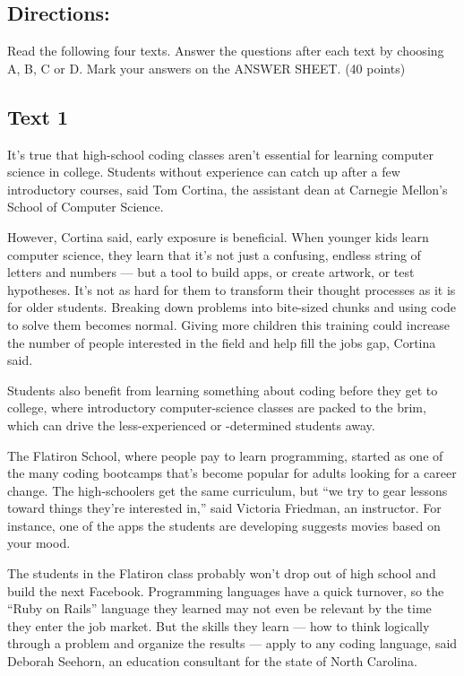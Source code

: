 \documentclass[UTF8,11pt]{ctexart}
\begin{document}
\subsection*{\textbf{Directions:}}


Read the following four texts. Answer the questions after each text by choosing A, B, C or D. Mark your answers on the ANSWER SHEET. (40 points)


\subsection*{\textbf{Text 1}}


It’s true that high-school coding classes aren’t essential for learning computer science in college. Students without experience can catch up after a few introductory courses, said Tom Cortina, the assistant dean at Carnegie Mellon’s School of Computer Science.


However, Cortina said, early exposure is beneficial. When younger kids learn computer science, they learn that it’s not just a confusing, endless string of letters and numbers — but a tool to build apps, or create artwork, or test hypotheses. It’s not as hard for them to transform their thought processes as it is for older students. Breaking down problems into bite-sized chunks and using code to solve them becomes normal. Giving more children this training could increase the number of people interested in the field and help fill the jobs gap, Cortina said.


Students also benefit from learning something about coding before they get to college, where introductory computer-science classes are packed to the brim, which can drive the less-experienced or -determined students away.


The Flatiron School, where people pay to learn programming, started as one of the many coding bootcamps that’s become popular for adults looking for a career change. The high-schoolers get the same curriculum, but “we try to gear lessons toward things they’re interested in,” said Victoria Friedman, an instructor. For instance, one of the apps the students are developing suggests movies based on your mood.


The students in the Flatiron class probably won’t drop out of high school and build the next Facebook. Programming languages have a quick turnover, so the “Ruby on Rails” language they learned may not even be relevant by the time they enter the job market. But the skills they learn — how to think logically through a problem and organize the results — apply to any coding language, said Deborah Seehorn, an education consultant for the state of North Carolina.
\end{document}
